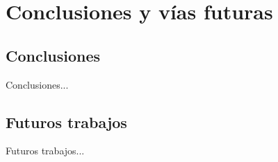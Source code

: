\chapter{Conclusiones y vías futuras\label{05conclusiones}}

\section{Conclusiones}

Conclusiones...

\section{Futuros trabajos}

Futuros trabajos...

